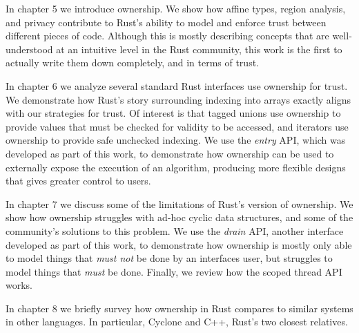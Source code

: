 In chapter 5 we introduce ownership. We show how affine types, region
analysis, and privacy contribute to Rust's ability to model and enforce trust
between different pieces of code. Although this is mostly describing concepts
that are well-understood at an intuitive level in the Rust community, this
work is the first to actually write them down completely, and in terms of
trust.

In chapter 6 we analyze several standard Rust interfaces use ownership for trust.
We demonstrate how Rust's story surrounding indexing into arrays exactly aligns
with our strategies for trust. Of interest is that tagged unions use ownership
to provide values that must be checked for validity to be accessed, and iterators
use ownership to provide safe unchecked indexing. We use the \emph{entry} API,
which was developed as part of this work, to demonstrate how ownership can be
used to externally expose the execution of an algorithm, producing more flexible
designs that gives greater control to users.

In chapter 7 we discuss some of the limitations of Rust's version of ownership.
We show how ownership struggles with ad-hoc cyclic data structures, and some
of the community's solutions to this problem. We use the \emph{drain} API,
another interface developed as part of this work, to demonstrate how ownership
is mostly only able to model things that \emph{must not} be done by an interfaces
user, but struggles to model things that \emph{must} be done. Finally, we review
how the scoped thread API works.

In chapter 8 we briefly survey how ownership in Rust compares to similar systems
in other languages. In particular, Cyclone and C++, Rust's two closest relatives.
